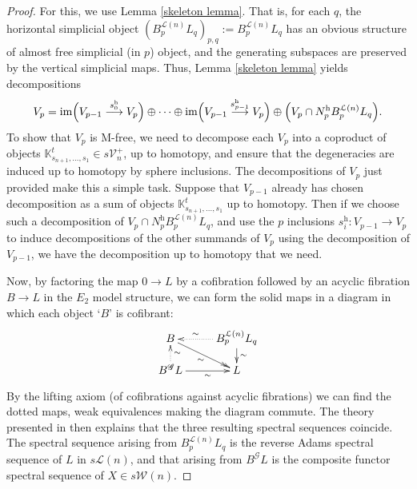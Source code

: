 \documentclass[11pt]{amsart} \renewcommand{\baselinestretch}{1.2}
\theoremstyle{plain}
\theoremstyle{definition}
\DeclareMathOperator{\im}{im}
\renewcommand{\to}{\longrightarrow}
\newcommand{\scrG}{\mathscr{G}}
\newcommand{\calL}{\mathcal{L}}
\newcommand{\calV}{\mathcal{V}}
\newcommand{\calw}{\mathcal{W}}
\newcommand{\vect}[2]{\calV^{#1}_{#2}}
\newcommand{\BSW}{{\scrG}}
\newcommand{\uhor}{^\mathrm{h}}
\begin{document}
\begin{Composite functor spectral sequences}
\begin{proof}
For this, we use Lemma \ref{skeleton lemma}. That is, for each $q$, the horizontal simplicial object $(B^{\calL(n)}_pL_q)_{p,q}:=B^{\calL(n)}_pL_q$ has an obvious structure of almost free simplicial (in $p$) object, and the generating subspaces are preserved by the vertical simplicial maps. Thus, Lemma \ref{skeleton lemma} yields decompositions
\[V_p=\im\Bigl(V_{p-1}\overset{s\uhor_0}{\to}V_p\Bigr)\oplus\cdots \oplus \im\Bigl(V_{p-1}\overset{s\uhor_{p-1}}{\to}V_p\Bigr)\oplus \Bigl(V_p\cap N\uhor_pB^{\calL(n)}_pL_q\Bigr).\]
To show that $V_p$ is M-free, we need to decompose each $V_p$ into a coproduct of objects $\mathbb{K}_{s_{n+1},\ldots,s_1}^t\in s\vect{+}{n}$, up to homotopy, and ensure that the degeneracies are induced up to homotopy by sphere inclusions. The decompositions of $V_p$ just provided make this a simple task.
Suppose that $V_{p-1}$ already has chosen decomposition as a sum of objects $\mathbb{K}_{s_{n+1},\ldots,s_1}^t$ up to homotopy. Then if we choose such a decomposition of $V_p\cap N\uhor_p B^{\calL(n)}_pL_q$, and use the $p$ inclusions $s\uhor_i:V_{p-1}\to V_p$ to induce decompositions of the other summands of $V_p$ using the decomposition of $V_{p-1}$, we have the decomposition up to homotopy that we need.

Now, by factoring the map $0\to L$ by a cofibration followed by an acyclic fibration $B\to L$ in the $E_2$ model structure, we can form the solid maps in a diagram in which each object `$B$' is cofibrant:
\[\xymatrix@R=4mm{
B\ar@{->>}[dr]_-{\sim}
&%
B^{\calL(n)}_pL_q\ar[d]^-{\sim}\ar@{..>}[l]_-{\sim}\\%
B^{\BSW}L\ar[r]_-{\sim}\ar@{..>}[u]_-{\sim}&%
L%
}\]
By the lifting axiom (of cofibrations against acyclic fibrations) we can find the dotted maps, weak equivalences making the diagram commute. The theory presented in \cite{DKS.pdf} then explains that the three resulting spectral sequences  coincide. The spectral sequence arising from $B^{\calL(n)}_pL_q$ is the reverse Adams spectral sequence of $L$ in $s\calL(n)$, and that arising from $B^{\BSW}L$ is the composite functor spectral sequence of $X\in s\calw(n)$.
\end{proof}
\end{Composite functor spectral sequences}
\end{document}
